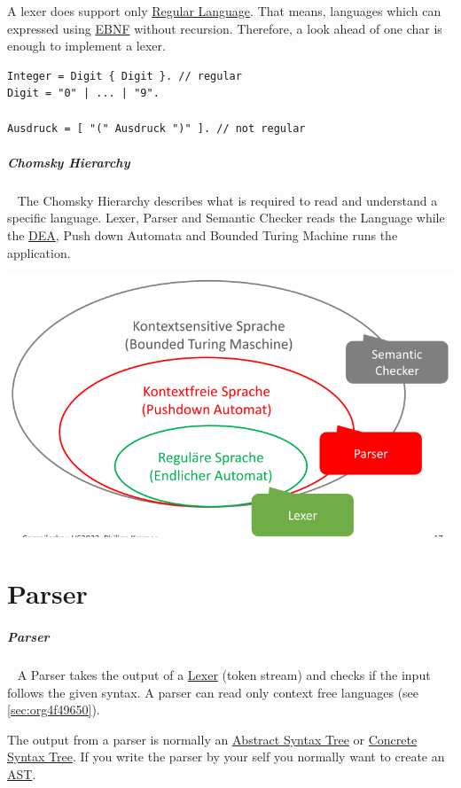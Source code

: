 \documentclass[11pt,twoside,landscape]{article}
\begin{document}
\begin{multicols}{3}
A lexer does support only \href{../../../roam/20221228124714-regular_language.org}{Regular Language}.
That means, languages which can expressed using \href{../../../roam/20221228120443-how_do_you_specify_the_syntax_of_a_language.org}{EBNF} without recursion.
Therefore, a look ahead of one char is enough to implement a lexer.

\begin{verbatim}
Integer = Digit { Digit }. // regular
Digit = "0" | ... | "9".

Ausdruck = [ "(" Ausdruck ")" ]. // not regular
\end{verbatim}
\subparagraph{Chomsky Hierarchy} \
\label{sec:org4f49650}
The Chomsky Hierarchy describes what is required to read and understand a specific language.
Lexer, Parser and Semantic Checker reads the Language while the \href{../../../roam/20211109182310-deterministic_finite_automaton.org}{DEA}, Push down Automata and Bounded Turing Machine runs the application.

{
\begin{center}
\includegraphics[width=.9\linewidth]{img/chomsky_hierarchie.png}
\end{center}
\label{fig:chomsky-hierarchy}
}

\section{Parser}
\label{sec:org15bcf01}
\subparagraph{Parser} \
\label{sec:org5ab0536}
A Parser takes the output of a \href{../../../roam/20221228115248-what_is_a_lexer.org}{Lexer} (token stream) and checks if the input follows the given syntax.
A parser can read only context free languages (see \ref{sec:org4f49650}).

The output from a parser is normally an \href{../../../roam/20221228141024-what_is_a_abstract_syntax_tree.org}{Abstract Syntax Tree} or \href{../../../roam/20221228140533-what_is_a_parse_tree.org}{Concrete Syntax Tree}.
If you write the parser by your self you normally want to create an \href{../../../roam/20221228141024-what_is_a_abstract_syntax_tree.org}{AST}.


\end{multicols}
\end{document}
